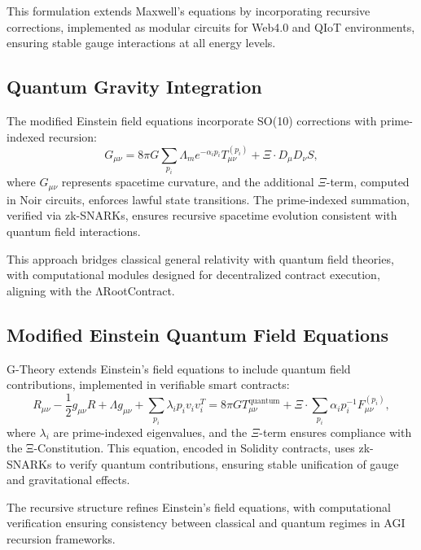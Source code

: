 \documentclass{article}
\theoremstyle{plain}
\begin{document}
This formulation extends Maxwell’s equations by incorporating recursive corrections, implemented as modular circuits for Web4.0 and QIoT environments, ensuring stable gauge interactions at all energy levels.

\subsection{Quantum Gravity Integration}
The modified Einstein field equations incorporate SO(10) corrections with prime-indexed recursion:
\begin{equation}
    G_{\mu\nu} = 8\pi G \sum_{p_i} \Lambda_m e^{-\alpha_i p_i} T_{\mu\nu}^{(p_i)} + \Xi \cdot D_{\mu} D_{\nu} S,
\end{equation}
where $G_{\mu\nu}$ represents spacetime curvature, and the additional $\Xi$-term, computed in Noir circuits, enforces lawful state transitions. The prime-indexed summation, verified via zk-SNARKs, ensures recursive spacetime evolution consistent with quantum field interactions.

This approach bridges classical general relativity with quantum field theories, with computational modules designed for decentralized contract execution, aligning with the ΛRootContract.

\subsection{Modified Einstein Quantum Field Equations}
G-Theory extends Einstein’s field equations to include quantum field contributions, implemented in verifiable smart contracts:
\begin{equation}
    R_{\mu\nu} - \frac{1}{2} g_{\mu\nu} R + \Lambda g_{\mu\nu} + \sum_{p_i} \lambda_i p_i v_i v_i^T = 8\pi G T_{\mu\nu}^{\text{quantum}} + \Xi \cdot \sum_{p_i} \alpha_i p_i^{-1} F_{\mu\nu}^{(p_i)},
\end{equation}
where $\lambda_i$ are prime-indexed eigenvalues, and the $\Xi$-term ensures compliance with the Ξ-Constitution. This equation, encoded in Solidity contracts, uses zk-SNARKs to verify quantum contributions, ensuring stable unification of gauge and gravitational effects.

The recursive structure refines Einstein’s field equations, with computational verification ensuring consistency between classical and quantum regimes in AGI recursion frameworks.
\end{document}
